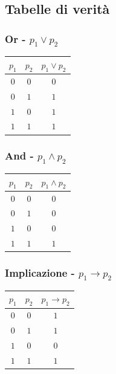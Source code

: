 \documentclass[a4paper,12pt]{report}
\begin{document}
\subsection{Tabelle di verit\`{a}}
\begin{multicols}{3}
\subsubsection{Or - $p_1\lor p_2$} 
\begin{tabular}{c c | c}
$p_1$ & $p_2$ & $p_1 \lor p_2$ \\
\hline
$0$ & $0$ & $0$ \\
$0$ & $1$ & $1$ \\
$1$ & $0$ & $1$ \\
$1$ & $1$ & $1$ 
\end{tabular}

\subsubsection{And - $p_1\wedge p_2$} 
\begin{tabular}{c c | c}
$p_1$ & $p_2$ & $p_1 \wedge p_2$ \\
\hline
$0$ & $0$ & $0$ \\
$0$ & $1$ & $0$ \\
$1$ & $0$ & $0$ \\
$1$ & $1$ & $1$ 
\end{tabular}
\subsubsection{Implicazione - $p_1\to p_2$} 
\begin{tabular}{c c | c}
$p_1$ & $p_2$ & $p_1 \to p_2$ \\
\hline
$0$ & $0$ & $1$ \\
$0$ & $1$ & $1$ \\
$1$ & $0$ & $0$ \\
$1$ & $1$ & $1$ 
\end{tabular}
\end{multicols}
\end{document}
